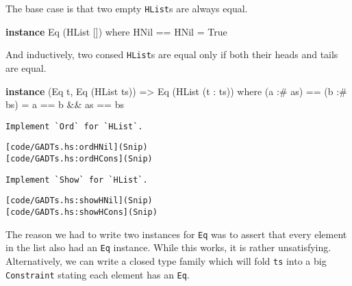 \documentclass[
  11pt,
]{book}
\newenvironment{Shaded}{}{}
\newcommand{\CharTok}[1]{\textcolor[rgb]{0.25,0.44,0.63}{#1}}
\newcommand{\DataTypeTok}[1]{\textcolor[rgb]{0.56,0.13,0.00}{#1}}
\newcommand{\KeywordTok}[1]{\textcolor[rgb]{0.00,0.44,0.13}{\textbf{#1}}}
\newcommand{\NormalTok}[1]{#1}
\newcommand{\OperatorTok}[1]{\textcolor[rgb]{0.40,0.40,0.40}{#1}}
\newcommand{\OtherTok}[1]{\textcolor[rgb]{0.00,0.44,0.13}{#1}}
\theoremstyle{nonumberplain}
\begin{document}
The base case is that two empty \texttt{HList}s are always equal.

\begin{Shaded}
\begin{Highlighting}[]
\KeywordTok{instance} \DataTypeTok{Eq}\NormalTok{ (}\DataTypeTok{HList} \CharTok{\textquotesingle{}[]) where}
  \DataTypeTok{HNil} \OperatorTok{==} \DataTypeTok{HNil} \OtherTok{=} \DataTypeTok{True}
\end{Highlighting}
\end{Shaded}

And inductively, two consed \texttt{HList}s are equal only if both their
heads and tails are equal.

\begin{Shaded}
\begin{Highlighting}[]
\KeywordTok{instance}\NormalTok{ (}\DataTypeTok{Eq}\NormalTok{ t, }\DataTypeTok{Eq}\NormalTok{ (}\DataTypeTok{HList}\NormalTok{ ts)) }\OtherTok{=\textgreater{}} \DataTypeTok{Eq}\NormalTok{ (}\DataTypeTok{HList}\NormalTok{ (t }\CharTok{\textquotesingle{}: ts)) where}
\NormalTok{  (a }\OperatorTok{:\#}\NormalTok{ as) }\OperatorTok{==}\NormalTok{ (b }\OperatorTok{:\#}\NormalTok{ bs) }\OtherTok{=}\NormalTok{ a }\OperatorTok{==}\NormalTok{ b }\OperatorTok{\&\&}\NormalTok{ as }\OperatorTok{==}\NormalTok{ bs}
\end{Highlighting}
\end{Shaded}

\begin{verbatim}
Implement `Ord` for `HList`.
\end{verbatim}

\begin{verbatim}
[code/GADTs.hs:ordHNil](Snip)
[code/GADTs.hs:ordHCons](Snip)
\end{verbatim}

\begin{verbatim}
Implement `Show` for `HList`.
\end{verbatim}

\begin{verbatim}
[code/GADTs.hs:showHNil](Snip)
[code/GADTs.hs:showHCons](Snip)
\end{verbatim}

The reason we had to write two instances for \texttt{Eq} was to assert
that every element in the list also had an \texttt{Eq} instance. While
this works, it is rather unsatisfying. Alternatively, we can write a
closed type family which will fold \texttt{ts} into a big
\texttt{Constraint} stating each element has an \texttt{Eq}.
\end{document}
